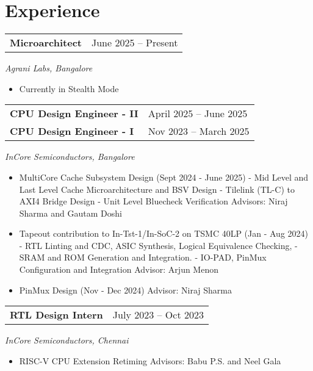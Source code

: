 \section{\sc Experience}


\begin{tabular}{@{}p{4in}p{2in}}
  {\bf{Microarchitect}}  & June 2025 – Present \\
\end{tabular}  
\textit{Agrani Labs, Bangalore} 
  \begin{itemize}
    \setlength\itemsep{0em}
    \item Currently in Stealth Mode
  \end{itemize}
\begin{tabular}{@{}p{4in}p{2in}}
    {\bf{CPU Design Engineer - II}}  & April 2025 – June 2025 \\
    {\bf{CPU Design Engineer - I}}  & Nov 2023 – March 2025 \\
  \end{tabular}  
  \textit{InCore Semiconductors, Bangalore} 
  \begin{itemize}
    \setlength\itemsep{0em}
    \item MultiCore Cache Subsystem Design (Sept 2024 - June 2025)
      \subitem - Mid Level and Last Level Cache Microarchitecture and BSV Design 
      \subitem - Tilelink (TL-C) to AXI4 Bridge Design
      \subitem - Unit Level Bluecheck Verification 
      \subitem Advisors: Niraj Sharma and Gautam Doshi     
    \item Tapeout contribution to In-Tst-1/In-SoC-2 on TSMC 40LP (Jan - Aug 2024)
      \subitem - RTL Linting and CDC, ASIC Synthesis, Logical Equivalence Checking, 
      \subitem - SRAM and ROM Generation and Integration.
      \subitem - IO-PAD, PinMux Configuration and Integration
      \subitem Advisor: Arjun Menon
    \item PinMux Design (Nov - Dec 2024)
      \subitem Advisor: Niraj Sharma       
\end{itemize}

\begin{tabular}{@{}p{4in}p{2in}}
  {\bf{RTL Design Intern}}  & July 2023 – Oct 2023 \\
\end{tabular}  
\textit{InCore Semiconductors, Chennai} 
\begin{itemize}
    \setlength\itemsep{0em}
  \item RISC-V CPU Extension Retiming 
    \subitem Advisors: Babu P.S. and Neel Gala  
\end{itemize}

